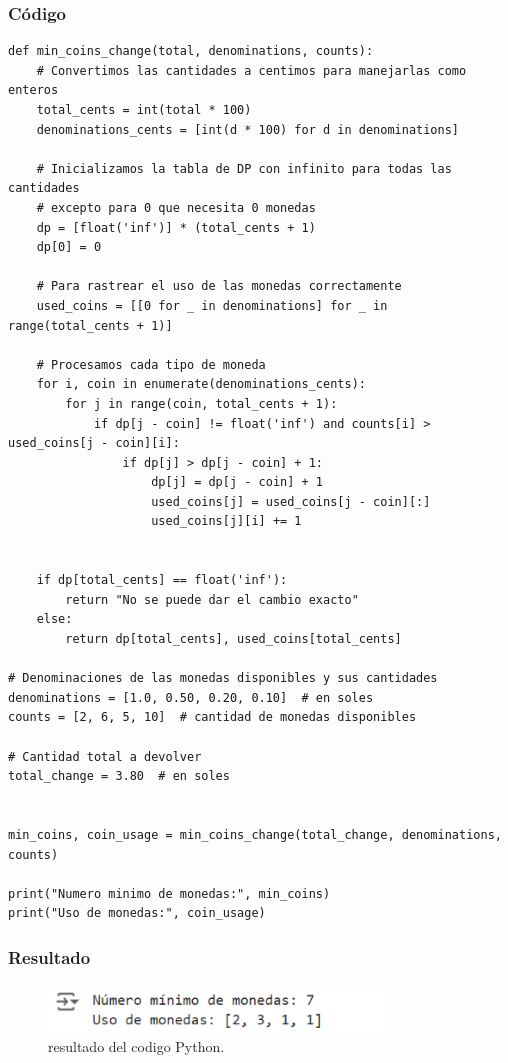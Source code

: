 \subsubsection{Código}
\begin{lstlisting}
def min_coins_change(total, denominations, counts):
    # Convertimos las cantidades a centimos para manejarlas como enteros
    total_cents = int(total * 100)
    denominations_cents = [int(d * 100) for d in denominations]

    # Inicializamos la tabla de DP con infinito para todas las cantidades
    # excepto para 0 que necesita 0 monedas
    dp = [float('inf')] * (total_cents + 1)
    dp[0] = 0

    # Para rastrear el uso de las monedas correctamente
    used_coins = [[0 for _ in denominations] for _ in range(total_cents + 1)]

    # Procesamos cada tipo de moneda
    for i, coin in enumerate(denominations_cents):
        for j in range(coin, total_cents + 1):
            if dp[j - coin] != float('inf') and counts[i] > used_coins[j - coin][i]:
                if dp[j] > dp[j - coin] + 1:
                    dp[j] = dp[j - coin] + 1
                    used_coins[j] = used_coins[j - coin][:]
                    used_coins[j][i] += 1


    if dp[total_cents] == float('inf'):
        return "No se puede dar el cambio exacto"
    else:
        return dp[total_cents], used_coins[total_cents]

# Denominaciones de las monedas disponibles y sus cantidades
denominations = [1.0, 0.50, 0.20, 0.10]  # en soles
counts = [2, 6, 5, 10]  # cantidad de monedas disponibles

# Cantidad total a devolver
total_change = 3.80  # en soles


min_coins, coin_usage = min_coins_change(total_change, denominations, counts)

print("Numero minimo de monedas:", min_coins)
print("Uso de monedas:", coin_usage)
\end{lstlisting}

\subsubsection{Resultado}
\begin{figure}[H]
    \centering
    \includegraphics[width=0.8\textwidth]{resultado_imagen.png}
    \caption{resultado del codigo Python.}
    \label{fig:resultado}
\end{figure}

